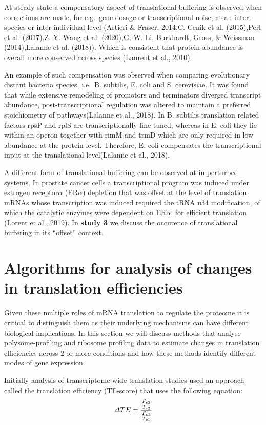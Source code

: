 \documentclass[12pt,openany]{book}
\begin{document}
At steady state a compensatory aspect of translational buffering is
observed when corrections are made, for e.g.~gene dosage or
transcriptional noise, at an inter-species or inter-individual level
(Artieri \& Fraser, 2014,C. Cenik et al. (2015),Perl et al. (2017),Z.-Y.
Wang et al. (2020),G.-W. Li, Burkhardt, Gross, \& Weissman
(2014),Lalanne et al. (2018)). Which is consistent that protein
abundance is overall more conserved across species (Laurent et al.,
2010).

An example of such compensation was observed when comparing evolutionary
distant bacteria species, i.e.~B. subtilis, E. coli and S. cerevisiae.
It was found that while extensive remodeling of promotors and
terminators diverged transcript abundance, post-transcriptional
regulation was altered to maintain a preferred stoichiometry of
pathways(Lalanne et al., 2018). In B. subtilis translation related
factors rpsP and rplS are transcriptionally fine tuned, whereas in E.
coli they lie within an operon together with rimM and trmD which are
only required in low abundance at the protein level. Therefore, E. coli
compensates the transcriptional input at the translational level(Lalanne
et al., 2018).

A different form of translational buffering can be observed at in
perturbed systems. In prostate cancer cells a transcriptional program
was induced under estrogen receptor\(\alpha\) (ER\(\alpha\)) depletion
that was offset at the level of translation. mRNAs whose transcription
was induced required the tRNA u34 modification, of which the catalytic
enzymes were dependent on ER\(\alpha\), for efficient translation
(Lorent et al., 2019). In \textbf{study 3} we discuss the occurence of
translational buffering in its ``offset'' context.

\section{Algorithms for analysis of changes in translation efficiencies}

Given these multiple roles of mRNA translation to regulate the proteome
it is critical to distinguish them as their underlying mechanisms can
have different biological implications. In this section we will discuss
methods that analyse polysome-profiling and ribosome profiling data to
estimate changes in translation efficiencies across 2 or more conditions
and how these methods identify different modes of gene expression.

Initially analysis of transcriptome-wide translation studies used an
approach called the translation efficiency (TE-score) that uses the
following equation:
\[\varDelta TE = \frac{\frac{P_{c2}}{T_{c2}}} {\frac{P_{c1}}{T_{c1}}}\\\]
\end{document}
